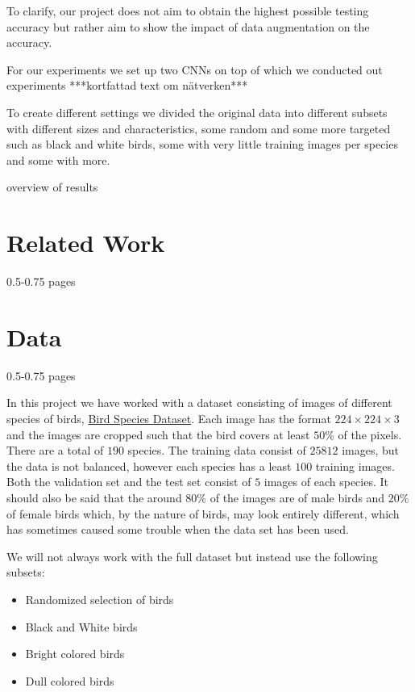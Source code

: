 \documentclass{article}
\begin{document}
To clarify, our project does not aim to obtain the highest possible testing accuracy but rather aim to show the impact of data augmentation 
on the accuracy. 

For our experiments we set up two CNNs on top of which we conducted out experiments ***kortfattad text om nätverken***

To create different settings we divided the original data into different subsets with different sizes and characteristics, some random and some more targeted such as black and white birds, some with very little training images per species and some with more.

overview of results

\section{Related Work}

0.5-0.75 pages




\section{Data}

0.5-0.75 pages

In this project we have worked with a dataset consisting of images of different species of birds, 
\href{https://www.kaggle.com/gpiosenka/100-bird-species}{Bird Species Dataset}. Each image has the format $224 \times 224 \times 3$ and the images are cropped such that the bird covers at least $50$\% of the pixels.
There are 
a total of $190$ species. The training data consist of $25812$ images, but the data is not balanced, however each species has a least $100$ training images. 
Both the validation set and the test set consist of $5$ images of each species. 
It should also be said that the around $80\%$ of the images are of male birds and $20\%$ of female 
birds which, by the nature of birds, may look entirely different, which has sometimes caused some trouble when the data set has been used.

We will not always work with the full dataset but instead use the following subsets:

\begin{itemize}
	\item Randomized selection of birds
	\item Black and White birds
	\item Bright colored birds
	\item Dull colored birds 
\end{itemize}
\end{document}
